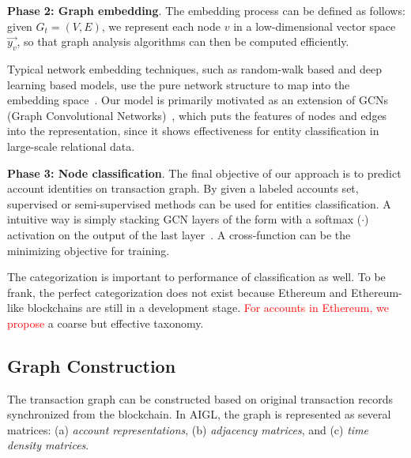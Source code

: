 \textbf{Phase 2: Graph embedding}.
The embedding process can be defined as follows: given $G_{t}=(V,E)$, we represent each node $v$ in a low-dimensional vector space $\vec{y_v}$, so that graph analysis algorithms can then be computed efficiently.

Typical network embedding techniques, such as random-walk based and deep learning based models, use the pure network structure to map into the embedding space~\cite{goyal2018capturing}. Our model is primarily motivated as an extension of GCNs (Graph Convolutional Networks)~\cite{kipf2016semi,schlichtkrull2018modeling}, which puts the features of nodes and edges into the representation, since it shows effectiveness for entity classification in large-scale relational data.


\textbf{Phase 3: Node classification}.
The final objective of our approach is to predict account identities on transaction graph. By given a labeled accounts set, supervised or semi-supervised methods can be used for entities classification. A intuitive way is simply stacking GCN layers of the form with a softmax ($\cdot$) activation on the output of the last layer~\cite{schlichtkrull2018modeling}. A cross-function can be the minimizing objective for training.

The categorization is important to performance of classification as well. To be frank, the perfect categorization does not exist because Ethereum and Ethereum-like blockchains are still in a development stage. \textcolor{red}{For accounts in Ethereum, we propose} a coarse but effective taxonomy.



\subsection{Graph Construction}
The transaction graph can be constructed based on original transaction records synchronized from the blockchain. In AIGL, the graph is represented as several matrices: (a) \emph{account representations}, (b) \emph{adjacency matrices}, and (c) \emph{time density matrices}.




